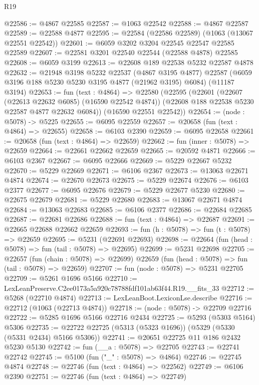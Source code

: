 \begin{lexlean}{R19}
\begin{coremodule}
@22586 := @4867 @22585
@22587 := @1063 @22542
@22588 := @4867 @22587
@22589 := @22588 @4877
@22595 := @22584 (@22586 @22589) (@1063 (@13067 @22551 @22542))
@22601 := @6059 @3202 @3204 @22545 @22547 @22585 @22589
@22607 := @22581 @3201 @22540 @22544 (@22588 @4878) @22585
@22608 := @6059 @3199
@22613 := @22608 @189 @22538 @5232 @22587 @4878
@22632 := @21948
    @3198
    @5232
    @22537
    (@4867 @3195 @4877)
    @22587
    (@6059 @3196 @188 @5230 @5230 @3195 @4877 (@21962 @3195) @6084)
    (@11187 @3194)
@22653 := fun (text : @4864) =>
  @22580
    (@22595
      (@22601
        (@22607 (@22613 @22632 @6085) (@16590 @22542 @4874))
        (@22608 @188 @22538 @5230 @22587 @4877 @22632 @6084))
      (@16590 @22551 @22542))
@22654 := (node : @5078) -> @5225
@22655 := @6095 @22559
@22657 := @20658 (fun (text : @4864) => @22655)
@22658 := @6103 @2390
@22659 := @6095 @22658
@22661 := @20658 (fun (text : @4864) => @22659)
@22662 := fun (inner : @5078) => @22659
@22664 := @22661 @22662 @22659
@22665 := @20592 @4871
@22666 := @6103 @2367
@22667 := @6095 @22666
@22669 := @5229 @22667 @5232
@22670 := @5229 @22669
@22671 := @6106 @2367
@22673 := @13063 @22671 @4874
@22674 := @22670 @22673
@22675 := @5229 @22674
@22676 := @6103 @2377
@22677 := @6095 @22676
@22679 := @5229 @22677 @5230
@22680 := @22675 @22679
@22681 := @5229 @22680
@22683 := @13067 @22671 @4874
@22684 := @13063 @22683
@22685 := @6106 @2377
@22686 := @22684 @22685
@22687 := @22681 @22686
@22688 := fun (text : @4864) => @22687
@22691 := @22665 @22688 @22662 @22659
@22693 := fun (h : @5078) => fun (t : @5078) => @22659
@22695 := @5231 (@22691 @22693)
@22698 := @22664 (fun (head : @5078) => fun (tail : @5078) => @22695)
@22699 := @5231 @22698
@22705 := @22657
    (fun (chain : @5078) => @22699)
    @22659
    (fun (head : @5078) => fun (tail : @5078) => @22659)
@22707 := fun (node : @5078) => @5231 @22705
@22709 := @5261 @1696 @5166
@22710 := LexLeanPreserve.C2ee0173a5a920c78788fdf101ab63f44.R19.__fits_33
@22712 := @5268 (@22710 @4874)
@22713 := LexLeanBoot.LexiconLse.describe
@22716 := @22712 (@1063 (@22713 @4874))
@22718 := (node : @5078) -> @22709 @22716
@22722 := @5285 @1696 @5166 @22716 @2434
@22725 := @5293 (@5303 @5164) @5306
@22735 := @22722 @22725 (@5313 (@5323 @1696)) (@5329 (@5330 (@5331 @2434) @5166 @5306))
@22741 := @20651 @22725 @11 @186 @2432 @5230 @5130
@22742 := fun (__a : @5078) => @22705
@22743 := @22741 @22742
@22745 := @5100 (fun ("_" : @5078) => @4864)
@22746 := @22745 @4874
@22748 := @22746 (fun (text : @4864) => @22562)
@22749 := @6106 @2390
@22751 := @22746 (fun (text : @4864) => @22749)

\end{coremodule}
\end{lexlean}
